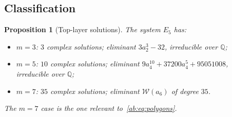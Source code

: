 \documentclass[a4paper,11pt]{article}
\theoremstyle{plain}
\newtheorem{proposition}[theorem]{Proposition}
\theoremstyle{definition}
\theoremstyle{remark}
\begin{document}
\subsection{Classification}

\begin{proposition}[Top-layer solutions]\label{ab:prop:top-class}
The system $E_5$ has:
\begin{itemize}[nosep]
\item $m=3$: $3$ complex solutions; eliminant $3a_2^3-32$, irreducible over $\mathbb{Q}$;
\item $m=5$: $10$ complex solutions; eliminant $9a_4^{10}+37200a_4^5+95051008$, irreducible over $\mathbb{Q}$;
\item $m=7$: $35$ complex solutions; eliminant $\mathcal{W}(a_6)$ of degree $35$.
\end{itemize}
The $m=7$ case is the one relevant to~\eqref{ab:eq:polygons}.
\end{proposition}
\end{document}
